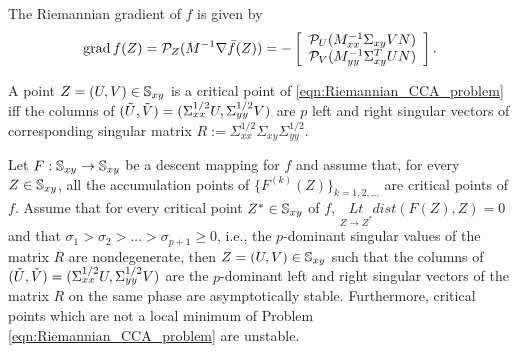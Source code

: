 \documentclass[11pt,a4paper]{article}
\begin{document}
The Riemannian gradient of $f$ is given by
\begin{equation}
\text{grad}\, f(Z) = \mathcal{P}_Z(M^{-1}\nabla \bar{f}(Z)) = -
\left[\begin{array}{c}\mathcal{P}_U(M_{xx}^{-1}\Sigma_{xy}VN)\\\mathcal{P}_V(M_{yy}^{-1}\Sigma_{xy}^TUN)\end{array}\right].
\end{equation}

\begin{prop}
A point $Z = (U,V)\in\mathbb{S}_{xy}$ is a critical point of \eqref{eqn:Riemannian_CCA_problem} iff the columns of $(\Tilde{U},\Tilde{V}) = (\Sigma_{xx}^{1/2}U,\Sigma_{yy}^{1/2}V)$ are $p$ left and right singular vectors of corresponding singular matrix $R:= \Sigma_{xx}^{1/2}\Sigma_{xy}\Sigma_{yy}^{1/2}$.
\end{prop}

\begin{prop}
Let $F:\mathbb{S}_{xy}\rightarrow \mathbb{S}_{xy}$ be a descent mapping for $f$ and assume that, for every $Z\in \mathbb{S}_{xy}$, all the accumulation points of $\{F^{(k)}(Z)\}_{k=1,2,\ldots}$ are critical points of $f$. Assume that for every critical point $Z^*\in \mathbb{S}_{xy}$ of $f$, $\underset{Z\rightarrow Z^*}{Lt}dist(F(Z),Z) = 0$ and that $\sigma_1>\sigma_2>\ldots>\sigma_{p+1}\ge 0$, i.e., the $p$-dominant singular values of the matrix $R$ are nondegenerate, then $Z = (U,V)\in \mathbb{S}_{xy}$ such that the columns of $(\Tilde{U},\Tilde{V}) = (\Sigma_{xx}^{1/2}U, \Sigma_{yy}^{1/2}V)$ are the $p$-dominant left and right singular vectors of the matrix $R$ on the same phase are asymptotically stable. Furthermore, critical points which are not a local minimum of Problem \eqref{eqn:Riemannian_CCA_problem} are unstable.
\end{prop}
\end{document}
